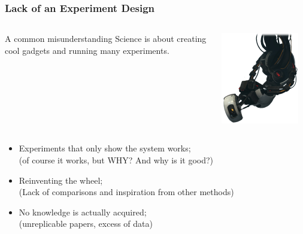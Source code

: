 \documentclass{beamer}
\begin{document}
\begin{frame}
  \frametitle{Lack of an Experiment Design}
  \begin{columns}[c]
    \begin{block}{A common misunderstanding}
      Science is about creating cool gadgets and running many experiments.
    \end{block}
    \includegraphics[width=0.9\textwidth]{img/glados.png}
  \end{columns}
  \vfill

  \begin{itemize}
  \item<2-> Experiments that only show the system works;\\
    {\small (of course it works, but WHY? And why is it good?)}
  \item<3-> Reinventing the wheel;\\
    {\small(Lack of comparisons and inspiration from other methods)}
  \item<4-> No knowledge is actually acquired;\\
    {\small(unreplicable papers, excess of data)}
  \end{itemize}
\end{frame}
\end{document}

